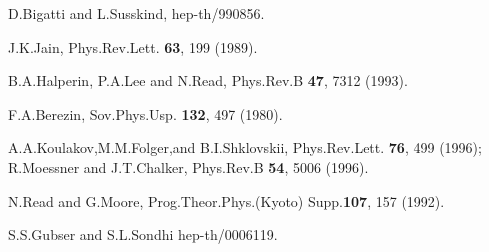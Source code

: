 \documentclass[a4paper,11pt]{article}
\begin{document}
\begin{thebibliography}{99}
D.Bigatti and L.Susskind, hep-th/990856.

J.K.Jain, Phys.Rev.Lett. {\bf 63}, 199 (1989).

B.A.Halperin, P.A.Lee and N.Read, Phys.Rev.B {\bf 47}, 7312 (1993).

F.A.Berezin, Sov.Phys.Usp. {\bf 132}, 497 (1980).

A.A.Koulakov,M.M.Folger,and B.I.Shklovskii,  
Phys.Rev.Lett. {\bf 76}, 499 (1996);
R.Moessner and J.T.Chalker, Phys.Rev.B {\bf 54}, 5006 (1996).

N.Read and G.Moore, Prog.Theor.Phys.(Kyoto) Supp.{\bf 107}, 157 (1992).

S.S.Gubser and S.L.Sondhi hep-th/0006119.

\end{thebibliography}
\vfill\eject
\end{document}
